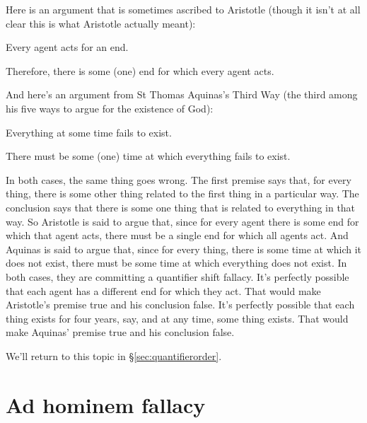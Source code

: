 Here is an argument that is sometimes ascribed to Aristotle (though it isn't at all clear this is what Aristotle actually meant):
\begin{earg}
\prem Every agent acts for an end.

\conc Therefore, there is some (one) end for which every agent acts.
\end{earg}
And here's an argument from St Thomas Aquinas's Third Way (the third among his five ways to argue for the existence of God):
\begin{earg}
\prem Everything at some time fails to exist.

\conc There must be some (one) time at which everything fails to exist.
\end{earg}
In both cases, the same thing goes wrong. The first premise says that, for every thing, there is some other thing related to the first thing in a particular way. The conclusion says that there is some one thing that is related to everything in that way. So Aristotle is said to argue that, since for every agent there is some end for which that agent acts, there must be a single end for which all agents act. And Aquinas is said to argue that, since for every thing, there is some time at which it does not exist, there must be some time at which everything does not exist. In both cases, they are committing a quantifier shift fallacy. It's perfectly possible that each agent has a different end for which they act. That would make Aristotle's premise true and his conclusion false. It's perfectly possible that each thing exists for four years, say, and at any time, some thing exists. That would make Aquinas' premise true and his conclusion false.

We'll return to this topic in \S\ref{sec:quantifierorder}.

\section{Ad hominem fallacy}

